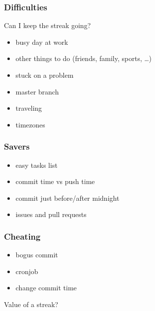 \documentclass[14pt]{beamer}
\begin{document}
  \begin{frame}
    \frametitle{Difficulties}
    Can I keep the streak going?
    \begin{itemize}
      \item busy day at work
      \item other things to do (friends, family, sports, \ldots)
      \item stuck on a problem
      \item master branch
      \item traveling
      \item timezones
    \end{itemize}
  \end{frame}
  \begin{frame}
    \frametitle{Savers}
    \begin{itemize}
      \item easy tasks list
      \item commit time vs push time
      \item commit just before/after midnight
      \item issues and pull requests
    \end{itemize}
  \end{frame}
  \begin{frame}
    \frametitle{Cheating}
    \begin{itemize}
      \item bogus commit
      \item cronjob
      \item change commit time
    \end{itemize}
    Value of a streak?
  \end{frame}
\end{document}
